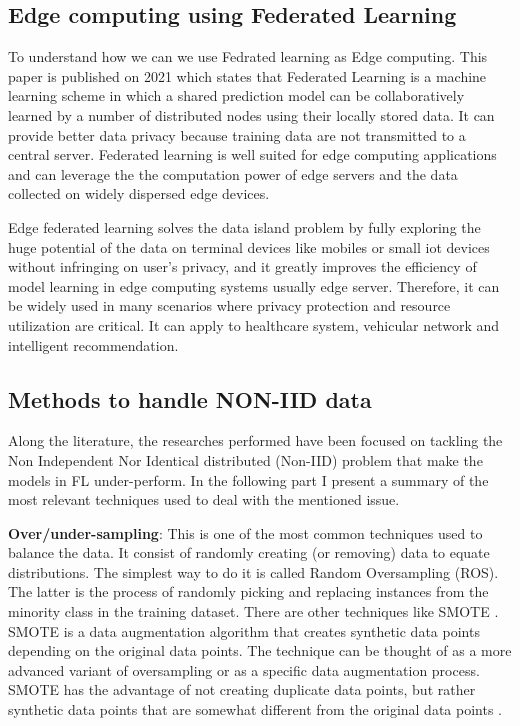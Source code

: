 \subsection{Edge computing using Federated Learning} \label{fedrated_learning_as_edge computing}

To understand how we can we use Fedrated learning as Edge computing. This paper \cite{fedrated_learning_as_edge_computing} is published on 2021 which states that Federated Learning is a machine learning scheme in which a shared prediction model can be collaboratively learned by a number of distributed nodes using their locally stored data. It can provide better data privacy because training data are not transmitted to a central server. Federated learning is well suited for edge computing applications and can leverage the the computation power of edge servers and the data collected on widely dispersed edge devices.

Edge federated learning solves the data island problem by fully exploring the huge potential of the data on terminal devices like mobiles or small iot devices without infringing on user’s privacy, and it greatly improves the efficiency of model learning in edge computing systems usually edge server.  Therefore, it can be widely used in many scenarios where privacy protection and resource utilization are critical. It can apply to healthcare system, vehicular network and intelligent recommendation. 


\subsection{Methods to handle NON-IID data} \label{non_iid_handling}

Along the literature, the researches performed have been focused on tackling the Non Independent Nor Identical distributed (Non-IID) problem that make the models in FL under-perform. In the following part I present a summary of the most relevant techniques used to deal with the mentioned issue.

\textbf{Over/under-sampling}: This is one of the most common techniques used to balance the data. It consist of randomly creating (or removing) data to equate distributions. The simplest way to do it is called Random Oversampling (ROS). The latter is the process of randomly picking and replacing instances from the minority class in the training dataset. There are other techniques like SMOTE \cite{metrics_ecg1}. SMOTE is a data augmentation algorithm that creates synthetic data points depending on the original data points. The technique can be thought of as a more advanced variant of oversampling or as a specific data augmentation process. SMOTE has the advantage of not creating duplicate data points, but rather synthetic data points that are somewhat different from the original data points \cite{imbalance_data3}.

